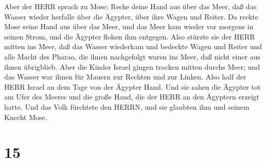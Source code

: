  Aber der HERR sprach zu Mose: Recke deine Hand aus über
das Meer, daß das Wasser wieder herfalle über die Ägypter, über ihre
Wagen und Reiter.  Da reckte Mose seine Hand aus über das
Meer, und das Meer kam wieder vor morgens in seinen Strom, und die
Ägypter flohen ihm entgegen. Also stürzte sie der HERR mitten ins Meer,
 daß das Wasser wiederkam und bedeckte Wagen und Reiter und
alle Macht des Pharao, die ihnen nachgefolgt waren ins Meer, daß nicht
einer aus ihnen übrigblieb.  Aber die Kinder Israel gingen
trocken mitten durchs Meer; und das Wasser war ihnen für Mauern zur
Rechten und zur Linken.  Also half der HERR Israel an dem
Tage von der Ägypter Hand. Und sie sahen die Ägypter tot am Ufer des
Meeres  und die große Hand, die der HERR an den Ägyptern
erzeigt hatte. Und das Volk fürchtete den HERRN, und sie glaubten ihm
und seinem Knecht Mose.

\hypertarget{section-14}{%
\section{15}\label{section-14}}

